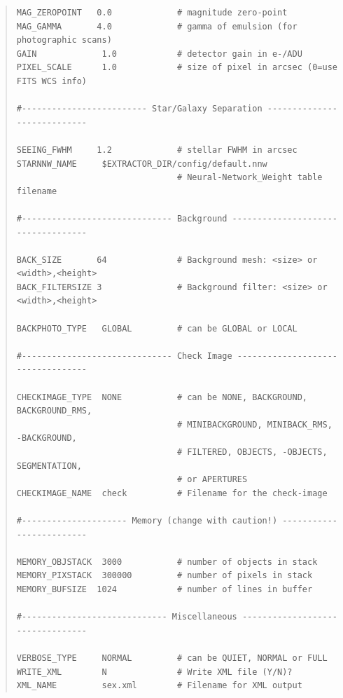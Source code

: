 \documentclass[twoside,11pt]{article}
\renewcommand{\_}{\texttt{\symbol{95}}}
\begin{document}
\begin{quote}
\begin{verbatim}
MAG_ZEROPOINT   0.0             # magnitude zero-point
MAG_GAMMA       4.0             # gamma of emulsion (for photographic scans)
GAIN             1.0            # detector gain in e-/ADU
PIXEL_SCALE      1.0            # size of pixel in arcsec (0=use FITS WCS info)

#------------------------- Star/Galaxy Separation ----------------------------

SEEING_FWHM     1.2             # stellar FWHM in arcsec
STARNNW_NAME     $EXTRACTOR_DIR/config/default.nnw
                                # Neural-Network_Weight table filename

#------------------------------ Background -----------------------------------

BACK_SIZE       64              # Background mesh: <size> or <width>,<height>
BACK_FILTERSIZE 3               # Background filter: <size> or <width>,<height>

BACKPHOTO_TYPE   GLOBAL         # can be GLOBAL or LOCAL

#------------------------------ Check Image ----------------------------------

CHECKIMAGE_TYPE  NONE           # can be NONE, BACKGROUND, BACKGROUND_RMS,
                                # MINIBACKGROUND, MINIBACK_RMS, -BACKGROUND,
                                # FILTERED, OBJECTS, -OBJECTS, SEGMENTATION,
                                # or APERTURES
CHECKIMAGE_NAME  check          # Filename for the check-image

#--------------------- Memory (change with caution!) -------------------------

MEMORY_OBJSTACK  3000           # number of objects in stack
MEMORY_PIXSTACK  300000         # number of pixels in stack
MEMORY_BUFSIZE  1024            # number of lines in buffer

#----------------------------- Miscellaneous ---------------------------------

VERBOSE_TYPE     NORMAL         # can be QUIET, NORMAL or FULL
WRITE_XML        N              # Write XML file (Y/N)?
XML_NAME         sex.xml        # Filename for XML output

\end{verbatim}\end{quote}
\normalsize

\end{document}
